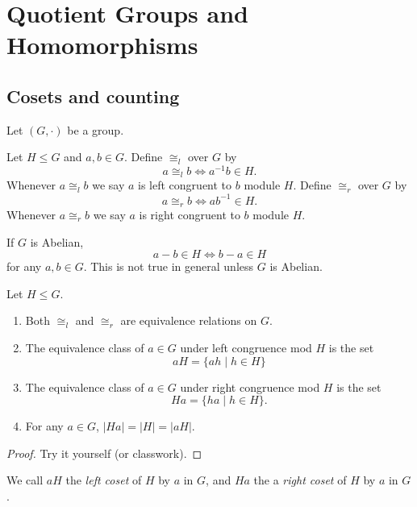 \documentclass[11pt,a4paper]{article}
\begin{document}
\def\contador{Lesson 6}


\section{Quotient Groups and Homomorphisms}

\subsection{Cosets and counting}

Let \((G,\cdot)\) be a group.


\begin{defi}
Let \(H\leq G\) and \(a,b\in G\).
Define \(\cong_l\) over \(G\) by 
\[a\cong_l b\iff a^{-1}b\in H.\]
Whenever \(a\cong_l b\) we say \(a\) is left congruent to \(b\) module \(H\).
Define \(\cong_r\) over \(G\) by 
\[a\cong_r b\iff ab^{-1}\in H.\]
Whenever \(a\cong_r b\) we say \(a\) is right congruent to \(b\) module \(H\).
\end{defi}

\begin{rem}
    If \(G\) is Abelian, \[a - b\in H\iff b-a\in H\]
    for any \(a,b\in G\).
    This is not true in general unless \(G\) is Abelian.
\end{rem}


\begin{teo}
    Let \(H\leq G\).
    \begin{enumerate}[label=(\roman*)]
        \item Both \(\cong_l\) and \(\cong_r\) are equivalence relations on $G$.
        
        \item The equivalence class of $a \in G$ under left congruence mod $H$ is the set
        \[
         aH = \{ah \mid h \in H\}
        \]
    \item The equivalence class of $a \in G$ under right  congruence mod $H$ is the set
    \[
    Ha = \{ha \mid h \in H\}  .
    \]


    \item For any \(a\in G\), \(\left|H a\right|=|H|=|a H|\).
    \end{enumerate}
\end{teo}

\begin{proof}
    Try it yourself (or classwork).
\end{proof}


We call \(aH\) the  \textit{left coset} of \(H\) by \(a\) in \(G\), and \(Ha\) the a \textit{right coset} of \(H\) by \(a\) in \(G\). 
\end{document}
